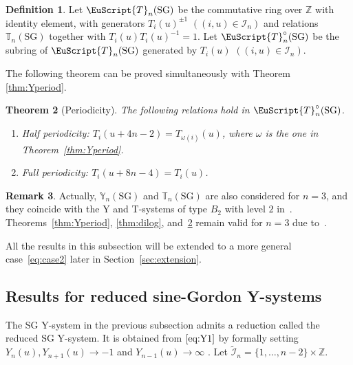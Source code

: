 \documentclass[pdftex]{sigma}
\numberwithin{equation}{section}
\newtheorem{Theorem}{Theorem}[section]
\theoremstyle{definition}
\newtheorem{Definition}[Theorem]{Definition}
\newtheorem{Remark}[Theorem]{Remark}
\begin{document}
\begin{Definition}
\label{defn:TC}
Let $\EuScript{T}_{n}(\mathrm{SG})$
be the commutative ring over $\mathbb{Z}$
with identity element,  with gene\-ra\-tors
$T_i(u)^{\pm 1}$ $((i,u)\in \mathcal{I}_{n})$
and relations $\mathbb{T}_{n}(\mathrm{SG})$
together with $T_i(u)T_i(u)^{-1}=1$.
Let $\EuScript{T}^{\circ}_{n}(\mathrm{SG})$
be the subring of $\EuScript{T}_{n}(\mathrm{SG})$
generated by
$T_i(u)$ $((i,u)\in \mathcal{I}_{n})$.
\end{Definition}

The following theorem can be proved simultaneously
with Theorem \ref{thm:Yperiod}.

\begin{Theorem}[Periodicity]
\label{thm:Tperiod}
The following relations hold in $\EuScript{T}^{\circ}_{n}(\mathrm{SG})$.
\begin{enumerate}\itemsep=0pt
\item[$(i)$] Half periodicity: $T_i(u+4n-2)=T_{\omega(i)}(u)$, where
$\omega$ is the  one in Theorem~{\rm \ref{thm:Yperiod}}.
\item[$(ii)$] Full periodicity: $T_i(u+8n-4)=T_i(u)$.
\end{enumerate}
\end{Theorem}

\begin{Remark}
Actually,
 $\mathbb{Y}_n(\mathrm{SG})$ and  $\mathbb{T}_n(\mathrm{SG})$
are also considered for $n=3$,
and they coincide with the Y and T-systems of
type $B_2$ with level $2$ in~\cite{Kuniba94a}.
Theorems~\ref{thm:Yperiod}, \ref{thm:dilog},
and~\ref{thm:Tperiod} remain valid for $n=3$
due to~\cite{Inoue10a}.
\end{Remark}

All the results in this subsection will be
extended to a more general case~\eqref{eq:case2}
later in Section~\ref{sec:extension}.

\subsection{Results for reduced sine-Gordon Y-systems}

The SG Y-system in the previous subsection admits
a reduction called the reduced SG Y-system.
It is  obtained from $\eqref{eq:Y1}$ by
formally setting $Y_{n}(u),Y_{n+1}(u)\rightarrow -1$
and $Y_{n-1}(u)\rightarrow \infty$ \cite{Tateo95}.
Let $\tilde{\mathcal{I}}_n=\{1,\dots,n-2\}\times \mathbb{Z}$.
\end{document}
